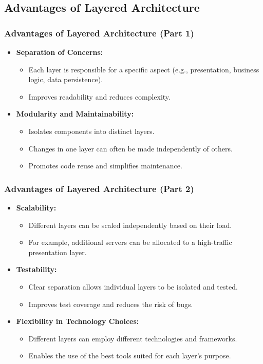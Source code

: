 \documentclass[aspectratio=169, table]{beamer}
\begin{document}
\subsection{Advantages of Layered Architecture}

\begin{frame}
	\frametitle{Advantages of Layered Architecture (Part 1)}
	\begin{itemize}
		\item \textbf{Separation of Concerns:}
		\begin{itemize}
			\item Each layer is responsible for a specific aspect (e.g., presentation, business logic, data persistence).
			\item Improves readability and reduces complexity.
		\end{itemize}
		\item \textbf{Modularity and Maintainability:}
		\begin{itemize}
			\item Isolates components into distinct layers.
			\item Changes in one layer can often be made independently of others.
			\item Promotes code reuse and simplifies maintenance.
		\end{itemize}
	\end{itemize}
\end{frame}

\begin{frame}
	\frametitle{Advantages of Layered Architecture (Part 2)}
	\begin{itemize}
		\item \textbf{Scalability:}
		\begin{itemize}
			\item Different layers can be scaled independently based on their load.
			\item For example, additional servers can be allocated to a high-traffic presentation layer.
		\end{itemize}
		\item \textbf{Testability:}
		\begin{itemize}
			\item Clear separation allows individual layers to be isolated and tested.
			\item Improves test coverage and reduces the risk of bugs.
		\end{itemize}
		\item \textbf{Flexibility in Technology Choices:}
		\begin{itemize}
			\item Different layers can employ different technologies and frameworks.
			\item Enables the use of the best tools suited for each layer's purpose.
		\end{itemize}
	\end{itemize}
\end{frame}
\end{document}
